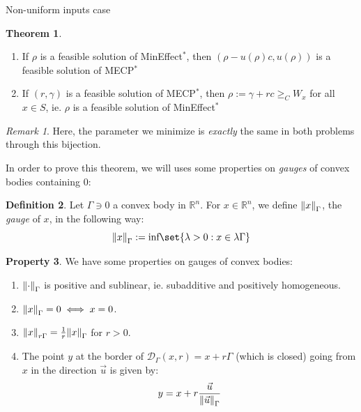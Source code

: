 \documentclass{article}
\theoremstyle{definition}
\newtheorem{theo}{Theorem}[section]
\newtheorem{prop}[theo]{Property}
\newtheorem{defi}[theo]{Definition}
\theoremstyle{remark}
\newtheorem*{rk}{Remark}
\begin{document}
\begin{subsubsection}{Non-uniform inputs case}
  \begin{theo}
    \begin{enumerate}
    \item If $\rho$ is a feasible solution of MinEffect$^*$, then $(\rho - u(\rho)c,u(\rho))$ is a feasible solution of MECP$^*$
    \item If $(r,\gamma)$ is a feasible solution of MECP$^*$, then $\rho := \gamma + rc \geq_C W_x$ for all $x \in S$, ie. $\rho$ is a feasible solution of MinEffect$^*$
    \end{enumerate}
    \label{theoEquivGen}
  \end{theo}

  \begin{rk}
    Here, the parameter we minimize is \emph{exactly} the same in both problems through this bijection.
  \end{rk}

  In order to prove this theorem, we will uses some properties on \emph{gauges} of convex bodies containing $0$:
  \begin{defi}
    Let $\Gamma \ni 0$ a convex body in $\mathbb{R}^n$. For $x \in \mathbb{R}^n$, we define $\norm{x}_{\Gamma}$, the \emph{gauge} of $x$, in the following way:
    \[ \norm{x}_{\Gamma} := \text{inf}\set{\lambda > 0 : x \in \lambda\Gamma}\]
  \end{defi}
  \begin{prop}
    We have some properties on gauges of convex bodies:
    \begin{enumerate}
    \item $\norm{\cdot}_{\Gamma}$ is positive and sublinear, ie. subadditive and positively homogeneous.
    \item $\norm{x}_{\Gamma} = 0 \iff x = 0$.
    \item $\norm{x}_{r\Gamma} = \frac{1}{r}\norm{x}_{\Gamma}$ for $r > 0$.
    \item The point $y$ at the border of $\mathcal{D}_{\Gamma}(x,r) = x + r\Gamma$ (which is closed) going from $x$ in the direction $\vec{u}$ is given by:
      \[y = x + r\frac{\vec{u}}{\norm{\vec{u}}_{\Gamma}}\]
    \end{enumerate}
  \end{prop}


\end{subsubsection}
\end{document}
